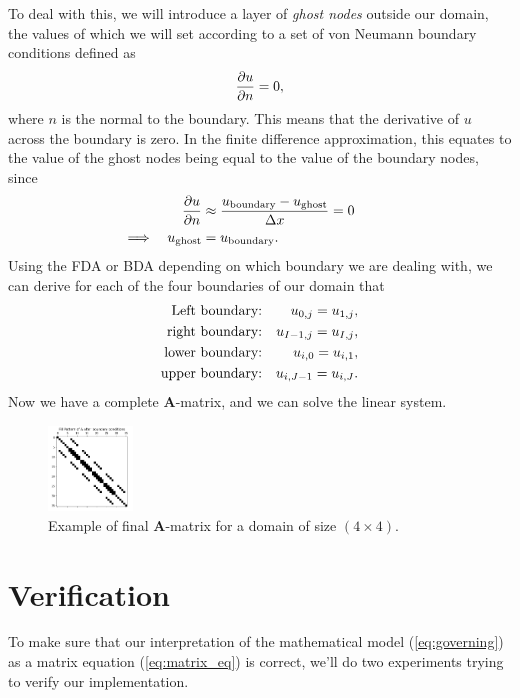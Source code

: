 \documentclass[acmtog]{acmart}
\begin{document}
To deal with this, we will introduce a layer of \textit{ghost nodes} outside
our domain, the values of which we will set according to a set of von Neumann
boundary conditions defined as
%
\begin{equation}
  \pdv{u}{n} = 0,
\end{equation}
%
where $n$ is the normal to the boundary. This means that the derivative of $u$
across the boundary is zero. In the finite difference approximation, this
equates to the value of the ghost nodes being equal to the value of the
boundary nodes, since
%
\begin{align}
           &  & \pdv{u}{n}       & \approx \frac{u_\mathrm{boundary} - u_\mathrm{ghost}}{\Delta x} = 0 \hspace{30pt} \\
  \implies &  & u_\mathrm{ghost} & = u_\mathrm{boundary}.
\end{align}
%
Using the FDA or BDA depending on which boundary we are dealing with, we can
derive for each of the four boundaries of our domain that
%
\begin{align}
  \text{Left boundary:}  &  & u_{0,j} = u_{1,j}, \notag     \\
  \text{right boundary:} &  & u_{I-1, j} = u_{I, j}, \notag \\
  \text{lower boundary:} &  & u_{i,0} = u_{i,1}, \notag     \\
  \text{upper boundary:} &  & u_{i, J-1} = u_{i, J}.
\end{align}
%
Now we have a complete $\boldsymbol A$-matrix, and we can solve the linear
system.

\begin{figure}[H]
  \centering
  \includegraphics[width=0.2\textwidth]{Images/A_matrix.png}
  \caption{Example of final $\boldsymbol A$-matrix for a domain of size $(4 \times 4)$.\label{fig:A_matrix}}
\end{figure}

\section{Verification}
To make sure that our interpretation of the mathematical model
(\ref{eq:governing}) as a matrix equation (\ref{eq:matrix_eq}) is correct,
we'll do two experiments trying to verify our implementation.
\end{document}
